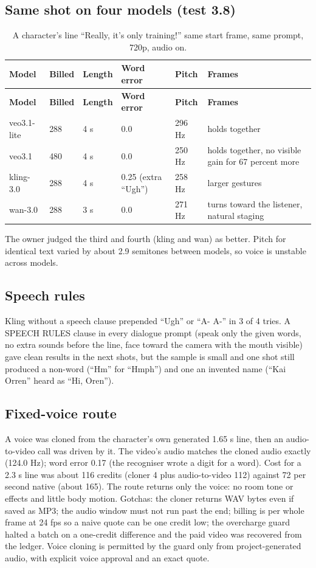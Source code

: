\documentclass[11pt,a4paper]{article}
\begin{document}
\subsection{Same shot on four models (test 3.8)}
\begin{longtable}{@{}P{3.1cm}P{1.7cm}P{1.5cm}P{3.2cm}P{1.8cm}P{4.2cm}@{}}
\caption{A character's line ``Really, it's only training!'' same start frame, same prompt, 720p, audio on.}\\
\toprule \textbf{Model} & \textbf{Billed} & \textbf{Length} & \textbf{Word error} & \textbf{Pitch} & \textbf{Frames}\\ \midrule\endfirsthead
\toprule \textbf{Model} & \textbf{Billed} & \textbf{Length} & \textbf{Word error} & \textbf{Pitch} & \textbf{Frames}\\ \midrule\endhead
veo3.1-lite & 288 & 4 s & 0.0 & 296 Hz & holds together\\
veo3.1 & 480 & 4 s & 0.0 & 250 Hz & holds together, no visible gain for 67 percent more\\
kling-3.0 & 288 & 4 s & 0.25 (extra ``Ugh'') & 258 Hz & larger gestures\\
wan-3.0 & 288 & 3 s & 0.0 & 271 Hz & turns toward the listener, natural staging\\
\bottomrule
\end{longtable}
The owner judged the third and fourth (kling and wan) as better. Pitch for identical text varied by about 2.9 semitones between models, so voice is unstable across models.

\subsection{Speech rules}
Kling without a speech clause prepended ``Ugh'' or ``A- A-'' in 3 of 4 tries. A SPEECH RULES clause in every dialogue prompt (speak only the given words, no extra sounds before the line, face toward the camera with the mouth visible) gave clean results in the next shots, but the sample is small and one shot still produced a non-word (``Hm'' for ``Hmph'') and one an invented name (``Kai Orren'' heard as ``Hi, Oren'').

\subsection{Fixed-voice route}
A voice was cloned from the character's own generated 1.65 s line, then an audio-to-video call was driven by it. The video's audio matches the cloned audio exactly (124.0 Hz); word error 0.17 (the recogniser wrote a digit for a word). Cost for a 2.3 s line was about 116 credits (cloner 4 plus audio-to-video 112) against 72 per second native (about 165). The route returns only the voice: no room tone or effects and little body motion. Gotchas: the cloner returns WAV bytes even if saved as MP3; the audio window must not run past the end; billing is per whole frame at 24 fps so a naive quote can be one credit low; the overcharge guard halted a batch on a one-credit difference and the paid video was recovered from the ledger. Voice cloning is permitted by the guard only from project-generated audio, with explicit voice approval and an exact quote.
\end{document}
